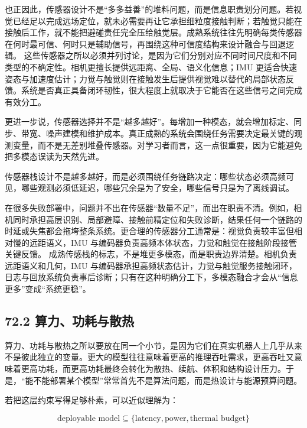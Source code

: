 也正因此，传感器设计不是“多多益善”的堆料问题，而是信息职责划分问题。若视觉已经足以完成远场定位，就未必需要再让它承担细粒度接触判断；若触觉只能在接触后工作，就不能把避碰责任完全压给触觉层。成熟系统往往先明确每类传感器在何时最可信、何时只是辅助信号，再围绕这种可信度结构来设计融合与回退逻辑。 这些传感器之所以必须并列讨论，是因为它们分别对应不同时间尺度和不同类型的不确定性。相机更擅长提供远距离、全局、语义化信息；IMU 更适合快速姿态与加速度估计；力觉与触觉则在接触发生后提供视觉难以替代的局部状态反馈。系统是否真正具备闭环韧性，很大程度上就取决于它能否在这些信号之间完成有效分工。

更进一步说，传感器选择并不是“越多越好”。每增加一种模态，就会增加标定、同步、带宽、噪声建模和维护成本。真正成熟的系统会围绕任务需要决定最关键的观测变量，而不是无差别堆叠传感器。对学习者而言，这一点很重要，因为它能避免把多模态误读为天然先进。

传感器栈设计不是越多越好，而是必须围绕任务链路决定：哪些状态必须高频可见，哪些观测必须低延迟，哪些冗余是为了安全，哪些信号只是为了离线调试。

在很多失败部署中，问题并不出在传感器“数量不足”，而出在职责不清。例如，相机同时承担高层识别、局部避障、接触前精定位和失败诊断，结果任何一个链路的时延或失焦都会拖垮整条系统。更合理的传感器分工通常是：视觉负责较丰富但相对慢的远距语义，IMU 与编码器负责高频本体状态，力觉和触觉在接触阶段接管关键反馈。 成熟传感栈的标志，不是堆更多模态，而是职责边界清楚。相机负责远距语义和几何，IMU 与编码器承担高频状态估计，力觉与触觉服务接触闭环，日志与回放系统负责事后诊断；只有在这种明确分工下，多模态融合才会从“信息更多”变成“系统更稳”。

\subsection*{72.2 算力、功耗与散热}


算力、功耗与散热之所以要放在同一个小节，是因为它们在真实机器人上几乎从来不是彼此独立的变量。更大的模型往往意味着更高的推理吞吐需求，更高吞吐又意味着更高功耗，而更高功耗最终会转化为散热、续航、体积和结构设计压力。于是，“能不能部署某个模型”常常首先不是算法问题，而是热设计与能源预算问题。

若把这层约束写得足够朴素，可以近似理解为：

\begingroup
\footnotesize
\begin{equation*}
\text{deployable model} \subseteq \{\text{latency}, \text{power}, \text{thermal budget}\}
\end{equation*}
\endgroup


